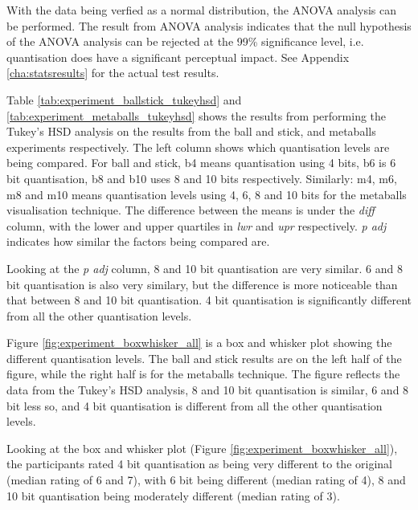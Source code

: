 With the data being verfied as a normal distribution, the ANOVA analysis can be
performed. The result from ANOVA analysis indicates that the null hypothesis of
the ANOVA analysis can be rejected at the 99\% significance level, i.e.
quantisation does have a significant perceptual impact. See Appendix
\ref{cha:statsresults} for the actual test results.

Table \ref{tab:experiment_ballstick_tukeyhsd} and
\ref{tab:experiment_metaballs_tukeyhsd} shows the results from performing the
Tukey's HSD analysis on the results from the ball and stick, and metaballs
experiments respectively. The left column shows which quantisation levels are
being compared. For ball and stick, b4 means quantisation using 4 bits, b6 is 6
bit quantisation, b8 and b10 uses 8 and 10 bits respectively. Similarly: m4,
m6, m8 and m10 means quantisation levels using 4, 6, 8 and 10 bits for the
metaballs visualisation technique. The difference between the means is under
the \emph{diff} column, with the lower and upper quartiles in \emph{lwr} and
\emph{upr} respectively. \emph{p adj} indicates how similar the factors being
compared are.

Looking at the \emph{p adj} column, 8 and 10 bit quantisation are very similar.
6 and 8 bit quantisation is also very similary, but the difference is more
noticeable than that between 8 and 10 bit quantisation. 4 bit quantisation is
significantly different from all the other quantisation levels.

Figure \ref{fig:experiment_boxwhisker_all} is a box and whisker plot showing
the different quantisation levels. The ball and stick results are on the left
half of the figure, while the right half is for the metaballs technique. The
figure reflects the data from the Tukey's HSD analysis, 8 and 10 bit
quantisation is similar, 6 and 8 bit less so, and 4 bit quantisation is
different from all the other quantisation levels.

Looking at the box and whisker plot (Figure
\ref{fig:experiment_boxwhisker_all}), the participants rated 4 bit quantisation
as being very different to the original (median rating of 6 and 7), with 6 bit
being different (median rating of 4), 8 and 10 bit quantisation being
moderately different (median rating of 3).

